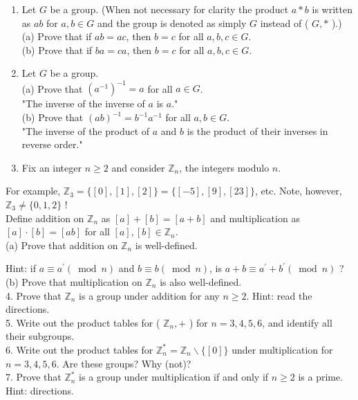 \begin{enumerate}
  \item Let $G$ be a group. (When not necessary for clarity the product $a * b$ is written as $a b$ for $a, b \in G$ and the group is denoted as simply $G$ instead of ( $G, *$ ).)\\
(a) Prove that if $a b=a c$, then $b=c$ for all $a, b, c \in G$.\\
(b) Prove that if $b a=c a$, then $b=c$ for all $a, b, c \in G$.
  \item Let $G$ be a group.\\
(a) Prove that $\left(a^{-1}\right)^{-1}=a$ for all $a \in G$.\\
"The inverse of the inverse of $a$ is $a$."\\
(b) Prove that $(a b)^{-1}=b^{-1} a^{-1}$ for all $a, b \in G$.\\
"The inverse of the product of $a$ and $b$ is the product of their inverses in reverse order."
  \item Fix an integer $n \geq 2$ and consider $\mathbb{Z}_{n}$, the integers modulo $n$.
\end{enumerate}

For example, $\mathbb{Z}_{3}=\{[0],[1],[2]\}=\{[-5],[9],[23]\}$, etc. Note, however, $\mathbb{Z}_{3} \neq\{0,1,2\}$ !\\
Define addition on $\mathbb{Z}_{n}$ as $[a]+[b]=[a+b]$ and multiplication as $[a] \cdot[b]=[a b]$ for all $[a],[b] \in \mathbb{Z}_{n}$.\\
(a) Prove that addition on $\mathbb{Z}_{n}$ is well-defined.

Hint: if $a \equiv a^{\prime}(\bmod n)$ and $b \equiv b(\bmod n)$, is $a+b \equiv a^{\prime}+b^{\prime}(\bmod n)$ ?\\
(b) Prove that multiplication on $\mathbb{Z}_{n}$ is also well-defined.\\
4. Prove that $\mathbb{Z}_{n}$ is a group under addition for any $n \geq 2$. Hint: read the directions.\\
5. Write out the product tables for ( $\mathbb{Z}_{n},+$ ) for $n=3,4,5,6$, and identify all their subgroups.\\
6. Write out the product tables for $\mathbb{Z}_{n}^{*}=\mathbb{Z}_{n} \backslash\{[0]\}$ under multiplication for $n=3,4,5,6$. Are these groups? Why (not)?\\
7. Prove that $\mathbb{Z}_{n}^{*}$ is a group under multiplication if and only if $n \geq 2$ is a prime. Hint: directions.




